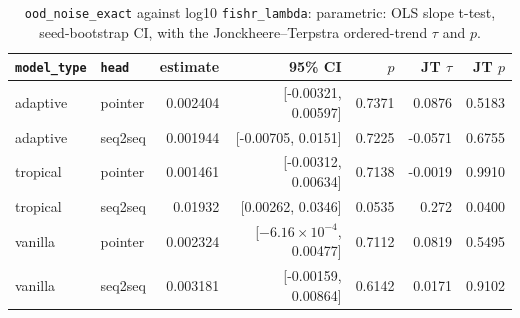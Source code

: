 \documentclass[10pt]{article}
\begin{document}
{\small
\begin{longtable}{llrrrrr}
\caption{\texttt{ood\_noise\_exact} against log10 \texttt{fishr\_lambda}: parametric: OLS slope t-test, seed-bootstrap CI, with the Jonckheere--Terpstra ordered-trend $\tau$ and $p$.}\label{tab:trend-ood_noise_exact}\\
\toprule
\texttt{model\_type} & \texttt{head} & estimate & 95\% CI & $p$ & JT $\tau$ & JT $p$\\
\midrule
\endhead
adaptive & pointer & 0.002404 & [-0.00321, 0.00597] & 0.7371 & 0.0876 & 0.5183\\
adaptive & seq2seq & 0.001944 & [-0.00705, 0.0151] & 0.7225 & -0.0571 & 0.6755\\
tropical & pointer & 0.001461 & [-0.00312, 0.00634] & 0.7138 & -0.0019 & 0.9910\\
tropical & seq2seq & 0.01932 & [0.00262, 0.0346] & 0.0535 & 0.272 & 0.0400\\
vanilla & pointer & 0.002324 & [$-6.16\times10^{-4}$, 0.00477] & 0.7112 & 0.0819 & 0.5495\\
vanilla & seq2seq & 0.003181 & [-0.00159, 0.00864] & 0.6142 & 0.0171 & 0.9102\\
\bottomrule
\end{longtable}
}
\end{document}
